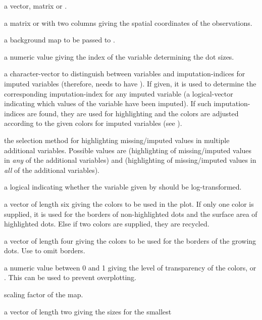 \begin{Arguments}
\begin{ldescription}
\item[\code{x}] a vector, matrix or .
\item[\code{coords}] a matrix or  with two columns giving 
the spatial coordinates of the observations.
\item[\code{map}] a background map to be passed to .
\item[\code{pos}] a numeric value giving the index of the variable 
determining the dot sizes.
\item[\code{delimiter}] a character-vector to distinguish between variables
and imputation-indices for imputed variables (therefore,  needs
to have ). If given, it is used to determine the corresponding
imputation-index for any imputed variable (a logical-vector indicating
which values of the variable have been imputed). If such imputation-indices
are found, they are used for highlighting and the colors are adjusted 
according to the given colors for imputed variables (see ).
\item[\code{selection}] the selection method for highlighting missing/imputed values 
in multiple additional variables.  Possible values are  
(highlighting of missing/imputed values in \emph{any} of the additional 
variables) and  (highlighting of missing/imputed values in 
\emph{all} of the additional variables).
\item[\code{log}] a logical indicating whether the variable given by 
 should be log-transformed.
\item[\code{col}] a vector of length six giving the colors to be used in the 
plot.  If only one color is supplied, it is used for the borders of 
non-highlighted dots and the surface area of highlighted dots.  Else if 
two colors are supplied, they are recycled.
\item[\code{border}] a vector of length four giving the colors to be used for the 
borders of the growing dots.  Use  to omit borders.
\item[\code{alpha}] a numeric value between 0 and 1 giving the level of 
transparency of the colors, or .  This can be used to
prevent overplotting.
\item[\code{scale}] scaling factor of the map.
\item[\code{size}] a vector of length two giving the sizes for the smallest 

\end{ldescription}
\end{Arguments}
